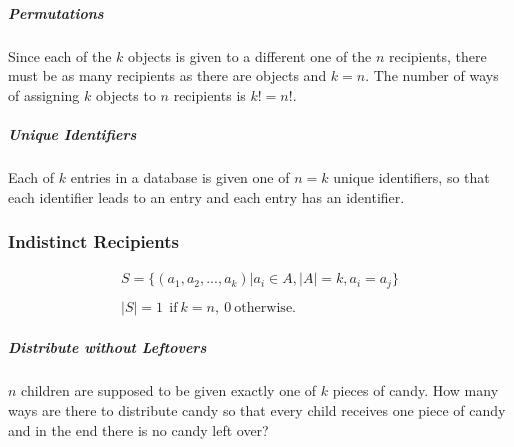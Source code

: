 \subparagraph{Permutations} Since each of the $k$ objects is given to a different one of the $n$ recipients, there must be as many recipients as there are objects and $k=n$. The number of ways of assigning $k$ objects to $n$ recipients is $k!=n!$.

\subparagraph{Unique Identifiers} Each of $k$ entries in a database is given one of $n=k$ unique identifiers, so that each identifier leads to an entry and each entry has an identifier. 

\subsubsection{Indistinct Recipients}

\begin{equation}	
\begin{array}{l}
S = \{ (a_1,a_2,...,a_k) | a_i \in A, |A| = k, a_i=a_j\}\\
\\
|S| = 1\ \ \mathrm{if\ }k = n,\ 0\ \mathrm{otherwise.}
\end{array}
\end{equation}

\chapauthor{}

\subparagraph{Distribute without Leftovers} $n$ children are supposed to be given exactly one of $k$ pieces of candy. How many ways are there to distribute candy so that every child receives one piece of candy and in the end there is no candy left over? 

